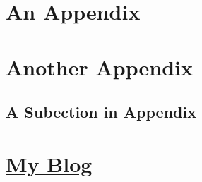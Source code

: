 \documentclass[11pt,oneside]{book}
\newcommand\myBlogUrl{http://schenax.student.ust.hk}
\begin{document}


\begin{appendices}
	\chapter{An Appendix}
	
	
	
	
	\chapter{Another Appendix}
	
	\section{A Subection in Appendix}
	
	\chapter{\href{\myBlogUrl}{\noindent My Blog \texorpdfstring{\small {}}{}}}
	
\end{appendices}
\end{document}
